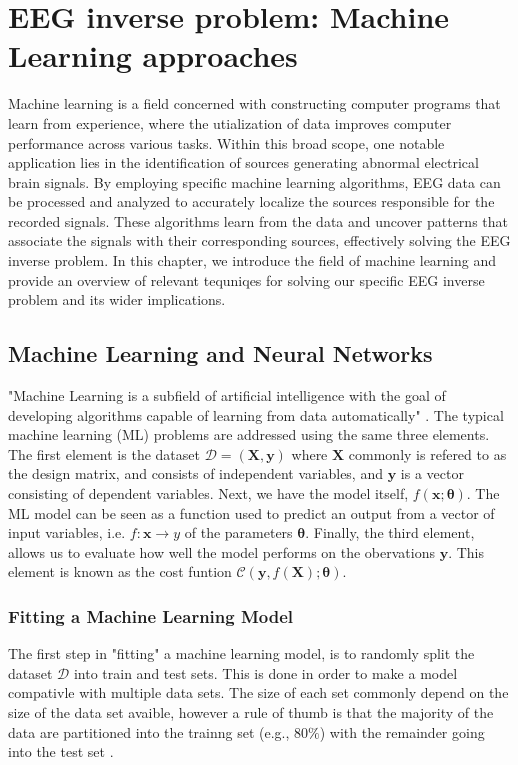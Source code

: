 \documentclass[a4paper, UKenglish, 11pt]{uiomaster}
\begin{document}
\chapter{EEG inverse problem: Machine Learning approaches}
Machine learning is a field concerned with constructing computer programs that learn from experience, where the utialization of data improves computer performance across various tasks. Within this broad scope, one notable application lies in the identification of sources generating abnormal electrical brain signals. By employing specific machine learning algorithms, EEG data can be processed and analyzed to accurately localize the sources responsible for the recorded signals. These algorithms learn from the data and uncover patterns that associate the signals with their corresponding sources, effectively solving the EEG inverse problem. In this chapter, we introduce the field of machine learning and provide an overview of relevant tequniqes for solving our specific EEG inverse problem and its wider implications.

\section{Machine Learning and Neural Networks}

"Machine Learning is a subfield of artificial intelligence with the goal of developing algorithms capable of learning from
data automatically" \cite{mehta2019high}. The typical machine learning (ML) problems are addressed using the same three elements. The first element is the dataset $\mathcal{D} = (\textbf{X}, \textbf{y})$ where $\textbf{X}$ commonly is refered to as the design matrix, and consists of independent variables, and $\textbf{y}$ is a vector consisting of dependent variables. Next, we have the model itself, $f(\textbf{x}; \boldsymbol{\theta})$. The ML model can be seen as a function used to predict an output from a vector of input variables, i.e. $f : \textbf{x} \rightarrow y$ of the parameters $\boldsymbol{\theta}$. Finally, the third element, allows us to evaluate how well the model performs on the obervations $\textbf{y}$. This element is known as the cost funtion $\mathcal{C}(\textbf{y}, f(\textbf{X}); \boldsymbol{\theta})$.

\subsection{Fitting a Machine Learning Model}
The first step in "fitting" a machine learning model, is to randomly split the dataset $\mathcal{D}$ into train and test sets. This is done in order to make a model compativle with multiple data sets. The size of each set commonly depend on the size of the data set avaible, however a rule of thumb is that the majority of the data are partitioned into the trainng set (e.g., 80$\%$) with the remainder going into the test set \cite{mehta2019high}.
\end{document}
